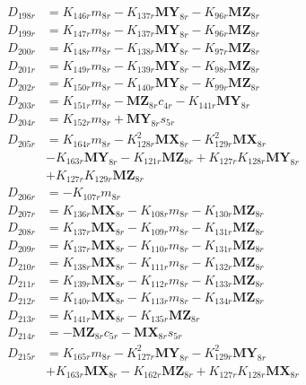 \begin{multicols}{2}
\begin{align}
D_{198r} &= K_{146r}m_{8r} - K_{137r}\mathbf{MY}_{8r} - K_{96r}\mathbf{MZ}_{8r} \nonumber \\
D_{199r} &= K_{147r}m_{8r} - K_{137r}\mathbf{MY}_{8r} - K_{96r}\mathbf{MZ}_{8r} \nonumber \\
D_{200r} &= K_{148r}m_{8r} - K_{138r}\mathbf{MY}_{8r} - K_{97r}\mathbf{MZ}_{8r} \nonumber \\
D_{201r} &= K_{149r}m_{8r} - K_{139r}\mathbf{MY}_{8r} - K_{98r}\mathbf{MZ}_{8r} \nonumber \\
D_{202r} &= K_{150r}m_{8r} - K_{140r}\mathbf{MY}_{8r} - K_{99r}\mathbf{MZ}_{8r} \nonumber \\
D_{203r} &= K_{151r}m_{8r} - \mathbf{MZ}_{8r}c_{4r} - K_{141r}\mathbf{MY}_{8r} \nonumber \\
D_{204r} &= K_{152r}m_{8r} + \mathbf{MY}_{8r}s_{5r} \nonumber \\
D_{205r} &= K_{164r}m_{8r} - K_{128r}^2\mathbf{MX}_{8r} - K_{129r}^2\mathbf{MX}_{8r}  \nonumber \\
&- K_{163r}\mathbf{MY}_{8r} - K_{121r}\mathbf{MZ}_{8r} + K_{127r}K_{128r}\mathbf{MY}_{8r}  \nonumber \\
&+ K_{127r}K_{129r}\mathbf{MZ}_{8r} \nonumber \\
D_{206r} &= -K_{107r}m_{8r} \nonumber \\
D_{207r} &= K_{136r}\mathbf{MX}_{8r} - K_{108r}m_{8r} - K_{130r}\mathbf{MZ}_{8r} \nonumber \\
D_{208r} &= K_{137r}\mathbf{MX}_{8r} - K_{109r}m_{8r} - K_{131r}\mathbf{MZ}_{8r} \nonumber \\
D_{209r} &= K_{137r}\mathbf{MX}_{8r} - K_{110r}m_{8r} - K_{131r}\mathbf{MZ}_{8r} \nonumber \\
D_{210r} &= K_{138r}\mathbf{MX}_{8r} - K_{111r}m_{8r} - K_{132r}\mathbf{MZ}_{8r} \nonumber \\
D_{211r} &= K_{139r}\mathbf{MX}_{8r} - K_{112r}m_{8r} - K_{133r}\mathbf{MZ}_{8r} \nonumber \\
D_{212r} &= K_{140r}\mathbf{MX}_{8r} - K_{113r}m_{8r} - K_{134r}\mathbf{MZ}_{8r} \nonumber \\
D_{213r} &= K_{141r}\mathbf{MX}_{8r} - K_{135r}\mathbf{MZ}_{8r} \nonumber \\
D_{214r} &= - \mathbf{MZ}_{8r}c_{5r} - \mathbf{MX}_{8r}s_{5r} \nonumber \\
D_{215r} &= K_{165r}m_{8r} - K_{127r}^2\mathbf{MY}_{8r} - K_{129r}^2\mathbf{MY}_{8r}  \nonumber \\
&+ K_{163r}\mathbf{MX}_{8r} - K_{162r}\mathbf{MZ}_{8r} + K_{127r}K_{128r}\mathbf{MX}_{8r}  \nonumber \\

\end{align}
\end{multicols}
